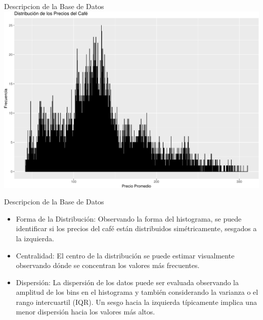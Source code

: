 \documentclass[
  10pt,
  ignorenonframetext,
  aspectratio=1612]{beamer}
\begin{document}
\begin{frame}{Descripcion de la Base de Datos}
\label{descripcion-de-la-base-de-datos-2}
\includegraphics{Informe_files/figure-beamer/unnamed-chunk-2-1.pdf}
\end{frame}

\begin{frame}{Descripcion de la Base de Datos}
\label{descripcion-de-la-base-de-datos-3}
\begin{itemize}
\item
  Forma de la Distribución: Observando la forma del histograma, se puede
  identificar si los precios del café están distribuidos simétricamente,
  sesgados a la izquierda.
\item
  Centralidad: El centro de la distribución se puede estimar visualmente
  observando dónde se concentran los valores más frecuentes.
\item
  Dispersión: La dispersión de los datos puede ser evaluada observando
  la amplitud de los bins en el histograma y también considerando la
  varianza o el rango intercuartil (IQR). Un sesgo hacia la izquierda
  típicamente implica una menor dispersión hacia los valores más altos.
\end{itemize}
\end{frame}
\end{document}
